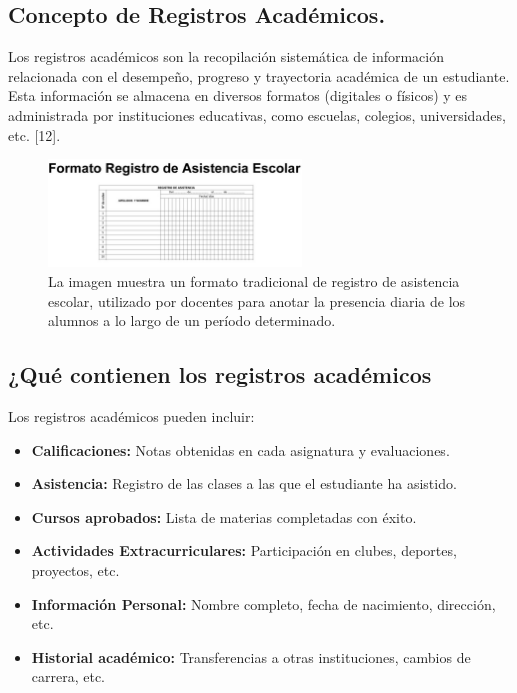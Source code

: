 \subsection{Concepto de Registros Académicos.}
Los registros académicos son la recopilación sistemática de información relacionada con el desempeño, progreso y trayectoria académica de un estudiante. Esta información se almacena en diversos formatos (digitales o físicos) y es administrada por instituciones educativas, como escuelas, colegios, universidades, etc. [12].
\begin{figure}[H]
  \centering
  \includegraphics[width=0.6\textwidth]{imagenes_doc/registroimg.jpg}
  \caption{La imagen muestra un formato tradicional de registro de asistencia escolar, utilizado por docentes para anotar la presencia diaria de los alumnos a lo largo de un período determinado.}
  \label{fig:logo}
\end{figure}



\subsection{¿Qué contienen los registros académicos}
Los registros académicos pueden incluir:

\begin{itemize}
  \item \textbf{Calificaciones:} Notas obtenidas en cada asignatura y evaluaciones.
  \item \textbf{Asistencia:} Registro de las clases a las que el estudiante ha asistido.
  \item \textbf{Cursos aprobados:} Lista de materias completadas con éxito.
  \item \textbf{Actividades Extracurriculares:} Participación en clubes, deportes, proyectos, etc.
  \item \textbf{Información Personal:} Nombre completo, fecha de nacimiento, dirección, etc.
  \item \textbf{Historial académico:} Transferencias a otras instituciones, cambios de carrera, etc.
\end{itemize}



